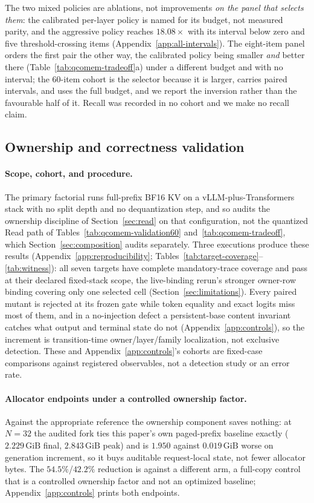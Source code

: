 \documentclass{article}
\newcommand{\gib}{\,\mathrm{GiB}}
\begin{document}
The two mixed policies are ablations, not improvements \emph{on the panel that
selects them}: the calibrated per-layer policy is named for its budget, not
measured parity, and the aggressive policy reaches $18.08\times$ with its
interval below zero and five threshold-crossing items
(Appendix~\ref{app:all-intervals}).  The eight-item panel orders the first pair
the other way, the calibrated policy being smaller \emph{and} better there
(Table~\ref{tab:qcomem-tradeoff}a) under a different budget and with no
interval; the 60-item cohort is the selector because it is larger,
carries paired intervals, and uses the full budget, and we report the inversion
rather than the favourable half of it.  Recall was recorded in no cohort and we
make no recall claim.

\subsection{Ownership and correctness validation}
\label{sec:correctness}
\label{sec:results}

\paragraph{Scope, cohort, and procedure.} \label{sec:target-status} The primary
factorial runs full-prefix BF16 KV on a vLLM-plus-Transformers stack with no
split depth and no dequantization step, and so audits the ownership discipline
of Section~\ref{sec:read} on that configuration, not the quantized Read path of
Tables~\ref{tab:qcomem-validation60} and~\ref{tab:qcomem-tradeoff}, which
Section~\ref{sec:composition} audits separately.  Three executions produce these
results (Appendix~\ref{app:reproducibility};
Tables~\ref{tab:target-coverage}--\ref{tab:witness}): all seven targets have
complete mandatory-trace coverage and pass at their declared fixed-stack scope,
the live-binding rerun's stronger owner-row binding covering only one selected
cell (Section~\ref{sec:limitations}).  Every paired mutant is rejected
at its frozen gate while token equality and exact logits miss most of them, and
in a no-injection defect a persistent-base content invariant catches what output
and terminal state do not (Appendix~\ref{app:controls}), so the increment is
transition-time owner/layer/family localization, not exclusive detection.  These and Appendix~\ref{app:controls}'s cohorts are fixed-case
comparisons against registered observables, not a detection study or an error
rate.

\paragraph{Allocator endpoints under a controlled ownership factor.}
Against the appropriate reference the ownership component saves nothing: at
$N=32$ the audited fork ties this paper's own paged-prefix baseline exactly
($2.229\gib$ final, $2.843\gib$ peak) and is $1.950$ against $0.019\gib$ worse on
generation increment, so it buys auditable request-local state, not fewer
allocator bytes.  The $54.5\%$/$42.2\%$ reduction is against a different arm, a
full-copy control that is a controlled ownership factor and not an optimized
baseline; Appendix~\ref{app:controls} prints both endpoints.
\end{document}

